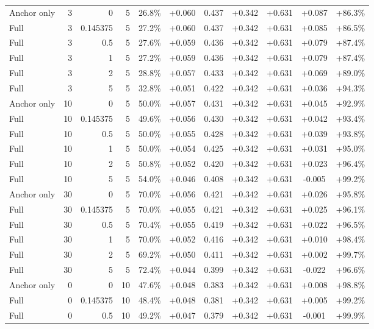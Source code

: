 \begin{table}[htbp]
\begin{tabular}{lrrrccccccc}
Anchor only & 3 & 0 & 5 & 26.8\% & +0.060 & 0.437 & +0.342 & +0.631 & +0.087 & +86.3\% \\
Full & 3 & 0.145375 & 5 & 27.2\% & +0.060 & 0.437 & +0.342 & +0.631 & +0.085 & +86.5\% \\
Full & 3 & 0.5 & 5 & 27.6\% & +0.059 & 0.436 & +0.342 & +0.631 & +0.079 & +87.4\% \\
Full & 3 & 1 & 5 & 27.2\% & +0.059 & 0.436 & +0.342 & +0.631 & +0.079 & +87.4\% \\
Full & 3 & 2 & 5 & 28.8\% & +0.057 & 0.433 & +0.342 & +0.631 & +0.069 & +89.0\% \\
Full & 3 & 5 & 5 & 32.8\% & +0.051 & 0.422 & +0.342 & +0.631 & +0.036 & +94.3\% \\
Anchor only & 10 & 0 & 5 & 50.0\% & +0.057 & 0.431 & +0.342 & +0.631 & +0.045 & +92.9\% \\
Full & 10 & 0.145375 & 5 & 49.6\% & +0.056 & 0.430 & +0.342 & +0.631 & +0.042 & +93.4\% \\
Full & 10 & 0.5 & 5 & 50.0\% & +0.055 & 0.428 & +0.342 & +0.631 & +0.039 & +93.8\% \\
Full & 10 & 1 & 5 & 50.0\% & +0.054 & 0.425 & +0.342 & +0.631 & +0.031 & +95.0\% \\
Full & 10 & 2 & 5 & 50.8\% & +0.052 & 0.420 & +0.342 & +0.631 & +0.023 & +96.4\% \\
Full & 10 & 5 & 5 & 54.0\% & +0.046 & 0.408 & +0.342 & +0.631 & -0.005 & +99.2\% \\
Anchor only & 30 & 0 & 5 & 70.0\% & +0.056 & 0.421 & +0.342 & +0.631 & +0.026 & +95.8\% \\
Full & 30 & 0.145375 & 5 & 70.0\% & +0.055 & 0.421 & +0.342 & +0.631 & +0.025 & +96.1\% \\
Full & 30 & 0.5 & 5 & 70.4\% & +0.055 & 0.419 & +0.342 & +0.631 & +0.022 & +96.5\% \\
Full & 30 & 1 & 5 & 70.0\% & +0.052 & 0.416 & +0.342 & +0.631 & +0.010 & +98.4\% \\
Full & 30 & 2 & 5 & 69.2\% & +0.050 & 0.411 & +0.342 & +0.631 & +0.002 & +99.7\% \\
Full & 30 & 5 & 5 & 72.4\% & +0.044 & 0.399 & +0.342 & +0.631 & -0.022 & +96.6\% \\
Anchor only & 0 & 0 & 10 & 47.6\% & +0.048 & 0.383 & +0.342 & +0.631 & +0.008 & +98.8\% \\
Full & 0 & 0.145375 & 10 & 48.4\% & +0.048 & 0.381 & +0.342 & +0.631 & +0.005 & +99.2\% \\
Full & 0 & 0.5 & 10 & 49.2\% & +0.047 & 0.379 & +0.342 & +0.631 & -0.001 & +99.9\% \\

\end{tabular}
\end{table}
